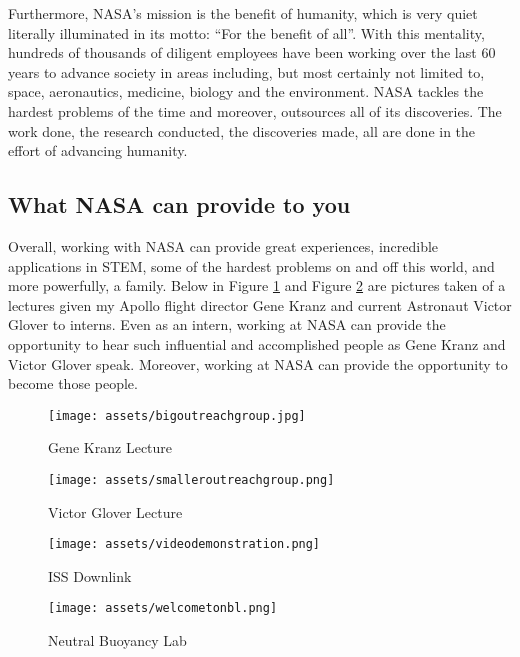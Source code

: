 \documentclass{article}
\let\Oldsubsection\subsection
\renewcommand{\subsection}{\FloatBarrier\Oldsubsection}
\begin{document}
Furthermore, NASA’s mission is the benefit of humanity, which is very quiet literally illuminated in its motto: “For the benefit of all”. With this mentality, hundreds of thousands of diligent employees have been working over the last 60 years to advance society in areas including, but most certainly not limited to, space, aeronautics, medicine, biology and the environment. NASA tackles the hardest problems of the time and moreover, outsources all of its discoveries. The work done, the research conducted, the discoveries made, all are done in the effort of advancing humanity.

\subsection{What NASA can provide to you}

Overall, working with NASA can provide great experiences, incredible applications in STEM, some of the hardest problems on and off this world, and more powerfully, a family. Below in Figure \ref{fig:bigoutreachgroup} and Figure \ref{fig:smalleroutreachgroup} are pictures taken of a lectures given my Apollo flight director Gene Kranz and current Astronaut Victor Glover to interns. Even as an intern, working at NASA can provide the opportunity to hear such influential and accomplished people as Gene Kranz and Victor Glover speak. Moreover, working at NASA can provide the opportunity to become those people.

\begin{figure}[!htb]
  \centering
  \texttt{[image: assets/bigoutreachgroup.jpg]}
  \caption{Gene Kranz Lecture}
  \label{fig:bigoutreachgroup}
\end{figure}

\begin{figure}[!htb]
  \centering
  \texttt{[image: assets/smalleroutreachgroup.png]}
  \caption{Victor Glover Lecture}
  \label{fig:smalleroutreachgroup}
\end{figure}

\begin{figure}[!htb]
  \centering
  \texttt{[image: assets/videodemonstration.png]}
  \caption{ISS Downlink}
  \label{fig:videodemonstration}
\end{figure}

\begin{figure}[!htb]
  \centering
  \texttt{[image: assets/welcometonbl.png]}
  \caption{Neutral Buoyancy Lab}
  \label{fig:welcometonbl}
\end{figure}
\end{document}
